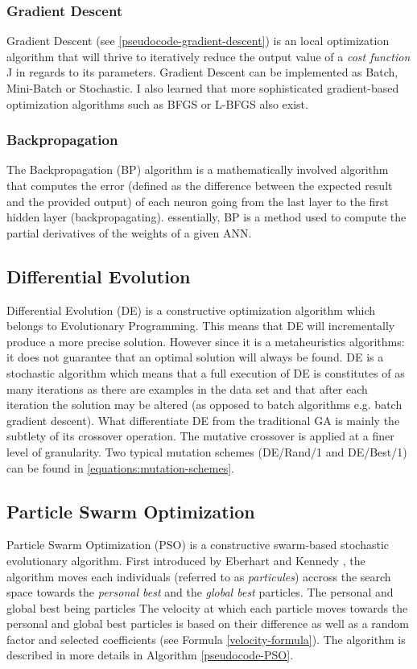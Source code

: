 \documentclass[a4paper,12pt, oneside]{memoir}
\begin{document}
\subsubsection{Gradient Descent}
Gradient Descent (see \ref{pseudocode-gradient-descent}) is an local optimization algorithm that will thrive to iteratively reduce the output value of a \textit{cost function} J in regards to its parameters. Gradient Descent can be implemented as Batch, Mini-Batch or Stochastic. I also learned that more sophisticated gradient-based optimization algorithms such as BFGS or L-BFGS also exist.

\subsubsection{Backpropagation}
The Backpropagation (BP) algorithm is a mathematically involved algorithm that computes the error (defined as the difference between the expected result and the provided output) of each neuron going from the last layer to the first hidden layer (backpropagating). essentially, BP is a method used to compute the partial derivatives of the weights of a given ANN.

\subsection{Differential Evolution}
Differential Evolution (DE) is a constructive optimization algorithm which belongs to Evolutionary Programming. This means that DE will incrementally produce a more precise solution. However since it is a metaheuristics algorithms: it does not guarantee that an optimal solution will always be found. DE is a stochastic algorithm which means that a full execution of DE is constitutes of as many iterations as there are examples in the data set and that after each iteration the solution may be altered (as opposed to batch algorithms e.g. batch gradient descent).  What differentiate DE from the traditional GA is mainly the subtlety of its crossover operation. The mutative crossover is applied at a finer level of granularity. Two typical mutation schemes (DE/Rand/1 and DE/Best/1) can be found in \eqref{equations:mutation-schemes}.

\newpage

\subsection{Particle Swarm Optimization}
Particle Swarm Optimization (PSO) is a constructive swarm-based stochastic evolutionary algorithm. First introduced by Eberhart and Kennedy \cite{eberhart-1995}, the algorithm moves each individuals (referred to as \textit{particules}) accross the search space towards the \textit{personal best} and the \textit{global best} particles. The personal and global best being particles The velocity at which each particle moves towards the personal and global best particles is based on their difference as well as a random factor and selected coefficients (see Formula \eqref{velocity-formula}). The algorithm is described in more details in Algorithm \ref{pseudocode-PSO}.
\end{document}
